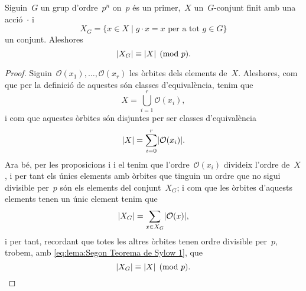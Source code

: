 \documentclass[../../main.tex]{subfiles}
\begin{document}
	\begin{lemma}
		\label{lema:Segon Teorema de Sylow}
		Siguin~\(G\) un grup d'ordre~\(p^{n}\) on~\(p\) és un primer,~\(X\) un~\(G\)-conjunt finit amb una acció~\(\cdot\) i
		\[
		    X_{G}=\{x\in X\mid g\cdot x=x\text{ per a tot }g\in G\}
		\]
		un conjunt.
		Aleshores
		\[
		    \abs{X_{G}}\equiv\abs{X}\pmod{p}.
		\]
		\begin{proof}
			Siguin~\(\mathcal{O}(x_{1}),\dots,\mathcal{O}(x_{r})\) les òrbites dels elements de~\(X\).
			Aleshores, com que per la definició de  aquestes són classes d'equivalència, tenim que %
			\[
			    X=\bigcup_{i=1}^{r}\mathcal{O}(x_{i}),
			\]
			i com que aquestes òrbites són disjuntes per ser classes d'equivalència
			\begin{equation}
		\label{eq:lema:Segon Teorema de Sylow 1}
			\abs{X}=\sum_{i=0}^{r}\abs{\mathcal{O}(x_{i})}.
			\end{equation}
			Ara bé, per les proposicions  i  i el  tenim que l'ordre~\(\mathcal{O}(x_{i})\) divideix l'ordre de~\(X\), i per tant els únics elements amb òrbites que tinguin un ordre que no sigui divisible per~\(p\) són els elements del conjunt~\(X_{G}\); i com que les òrbites d'aquests elements tenen un únic element tenim que
			\[
			    \abs{X_{G}}=\sum_{x\in X_{G}}\abs{\mathcal{O}(x)},
			\]
			i per tant, recordant que totes les altres òrbites tenen ordre divisible per~\(p\), trobem, amb \eqref{eq:lema:Segon Teorema de Sylow 1}, que
			\[
			    \abs{X_{G}}\equiv\abs{X}\pmod{p}.\qedhere
			\]
		\end{proof}
	\end{lemma}
\end{document}
